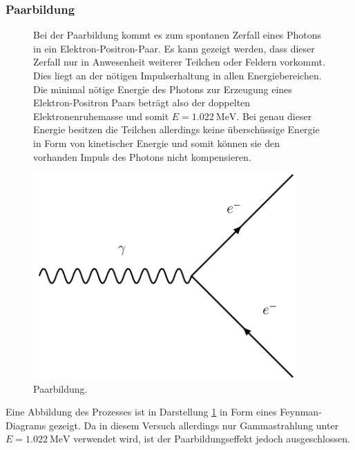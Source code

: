 \subsubsection{Paarbildung}
\begin{figure}
    \begin{minipage}{0.5\textwidth}
        Bei der Paarbildung kommt es zum spontanen Zerfall eines Photons in ein Elektron-Positron-Paar. Es kann gezeigt werden, dass dieser Zerfall nur in Anwesenheit weiterer Teilchen oder Feldern vorkommt. Dies liegt an der nötigen
        Impulserhaltung in allen Energiebereichen. Die minimal nötige Energie des Photons zur Erzeugung eines Elektron-Positron Paars beträgt also der doppelten Elektronenruhemasse und somit $E = \SI{1.022}{\mega\electronvolt}$. Bei genau dieser
        Energie besitzen die Teilchen allerdings keine überschüssige Energie in Form von kinetischer Energie und somit können sie den vorhanden Impuls des Photons nicht kompensieren.
    \end{minipage}
    \begin{minipage}{0.5\textwidth}
        \centering
        \includegraphics[width=0.9\textwidth]{bilder/paarbildung.pdf}
        \caption{Paarbildung. \cite{feynman}}
        \label{fig:lol1}
    \end{minipage}
    \end{figure}

Eine Abbildung des Prozesses ist in Darstellung \ref{fig:lol1} in Form eines
Feynman-Diagrams gezeigt. Da in diesem Versuch allerdings nur Gammastrahlung unter $E = \SI{1.022}{\mega\electronvolt}$ verwendet wird, ist der Paarbildungseffekt jedoch ausgeschlossen.
